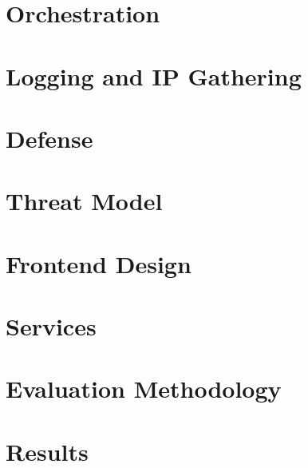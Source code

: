 \documentclass[letterpaper,twocolumn,10pt]{article}
\begin{document}
\section{Orchestration}


\section{Logging and IP Gathering}


\section{Defense}


\section{Threat Model}


\section{Frontend Design}



\section{Services}



\section{Evaluation Methodology}



\section{Results}




\end{document}
